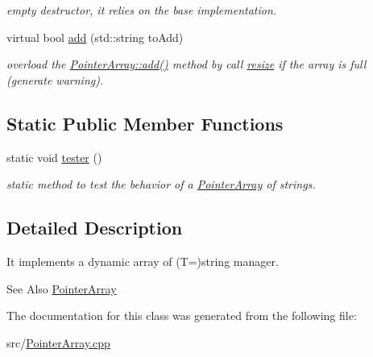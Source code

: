 \begin{DoxyCompactItemize}
\begin{DoxyCompactList}\small\item\em empty destructor, it relies on the base implementation. \end{DoxyCompactList}\item 
\hypertarget{classplist_1_1StringPointerArray_a51c87dfdb85522a7d0eed8961726e8a0}{virtual bool \hyperlink{classplist_1_1StringPointerArray_a51c87dfdb85522a7d0eed8961726e8a0}{add} (std\-::string to\-Add)}\label{classplist_1_1StringPointerArray_a51c87dfdb85522a7d0eed8961726e8a0}

\begin{DoxyCompactList}\small\item\em overload the \hyperlink{classplist_1_1PointerArray_a1f54fb5e285e55798f89c1d8d3896d95}{Pointer\-Array\-::add()} method by call \hyperlink{classplist_1_1PointerArray_a029b375c7e17f2c08e8d6a3ee486f8fe}{resize} if the array is full (generate warning). \end{DoxyCompactList}\end{DoxyCompactItemize}
\subsection*{Static Public Member Functions}
\begin{DoxyCompactItemize}
\item 
\hypertarget{classplist_1_1StringPointerArray_ab27123144831936be6c1d19f1613ef50}{static void \hyperlink{classplist_1_1StringPointerArray_ab27123144831936be6c1d19f1613ef50}{tester} ()}\label{classplist_1_1StringPointerArray_ab27123144831936be6c1d19f1613ef50}

\begin{DoxyCompactList}\small\item\em static method to test the behavior of a \hyperlink{classplist_1_1PointerArray}{Pointer\-Array} of strings. \end{DoxyCompactList}\end{DoxyCompactItemize}


\subsection{Detailed Description}
It implements a dynamic array of (T=)string manager. \begin{DoxySeeAlso}{See Also}
\hyperlink{classplist_1_1PointerArray}{Pointer\-Array} 
\end{DoxySeeAlso}


The documentation for this class was generated from the following file\-:\begin{DoxyCompactItemize}
\item 
src/\hyperlink{PointerArray_8cpp}{Pointer\-Array.\-cpp}\end{DoxyCompactItemize}
